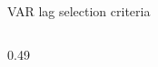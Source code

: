 \begin{frame}{VAR lag selection criteria}
\begin{columns}[T]
\begin{column}{0.49\textwidth}
\end{column}
\end{columns}

\end{frame}
